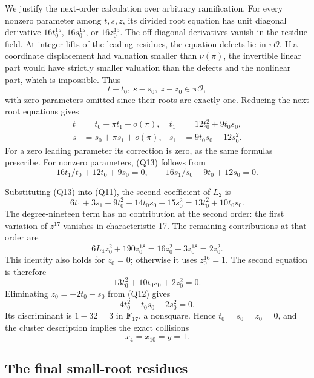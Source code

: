 \documentclass[
  british,
  10pt,
  a4paper,
]{article}
\begin{document}
We justify the next-order calculation over arbitrary ramification. For
every nonzero parameter among \(t,s,z\), its divided root equation has
unit diagonal derivative \(16t_0^{15}\), \(16s_0^{15}\), or
\(16z_0^{15}\). The off-diagonal derivatives vanish in the residue
field. At integer lifts of the leading residues, the equation defects
lie in \(\pi\mathcal O\). If a coordinate displacement had valuation
smaller than \(\nu(\pi)\), the invertible linear part would have
strictly smaller valuation than the defects and the nonlinear part,
which is impossible. Thus \[
t-t_0,\ s-s_0,\ z-z_0\in\pi\mathcal O,
\] with zero parameters omitted since their roots are exactly one.
Reducing the next root equations gives \[
\begin{aligned}
t&=t_0+\pi t_1+o(\pi),&t_1&=12t_0^2+9t_0s_0,\\
s&=s_0+\pi s_1+o(\pi),&s_1&=9t_0s_0+12s_0^2.
\end{aligned} \tag{Q13}
\] For a zero leading parameter its correction is zero, as the same
formulas prescribe. For nonzero parameters, (Q13) follows from \[
16t_1/t_0+12t_0+9s_0=0,\qquad
16s_1/s_0+9t_0+12s_0=0.
\]

Substituting (Q13) into (Q11), the second coefficient of \(L_2\) is \[
6t_1+3s_1+9t_0^2+14t_0s_0+15s_0^2
=13t_0^2+10t_0s_0.
\] The degree-nineteen term has no contribution at the second order: the
first variation of \(z^{17}\) vanishes in characteristic 17. The
remaining contributions at that order are \[
6\bar L_4z_0^2+190z_0^{18}=16z_0^2+3z_0^{18}=2z_0^2.
\] This identity also holds for \(z_0=0\); otherwise it uses
\(z_0^{16}=1\). The second equation is therefore \[
13t_0^2+10t_0s_0+2z_0^2=0. \tag{Q14}
\] Eliminating \(z_0=-2t_0-s_0\) from (Q12) gives \[
4t_0^2+t_0s_0+2s_0^2=0.
\] Its discriminant is \(1-32=3\) in \(\mathbf F_{17}\), a nonsquare.
Hence \(t_0=s_0=z_0=0\), and the cluster description implies the exact
collisions \[
x_4=x_{10}=y=1. \tag{Q15}
\]

\subsection{The final small-root
residues}\label{the-final-small-root-residues}
\end{document}
